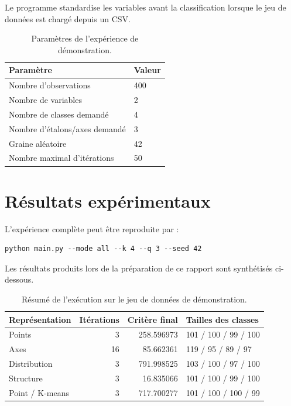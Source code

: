 \documentclass[12pt,a4paper]{article}
\begin{document}
Le programme standardise les variables avant la classification lorsque le jeu de données est chargé depuis un CSV.

\begin{table}[H]
\centering
\caption{Paramètres de l'expérience de démonstration.}
\begin{tabular}{ll}
\toprule
Paramètre & Valeur \\
\midrule
Nombre d'observations & 400 \\
Nombre de variables & 2 \\
Nombre de classes demandé & 4 \\
Nombre d'étalons/axes demandé & 3 \\
Graine aléatoire & 42 \\
Nombre maximal d'itérations & 50 \\
\bottomrule
\end{tabular}
\end{table}

\section{Résultats expérimentaux}

L'expérience complète peut être reproduite par :

\begin{verbatim}
python main.py --mode all --k 4 --q 3 --seed 42
\end{verbatim}

Les résultats produits lors de la préparation de ce rapport sont synthétisés ci-dessous.

\begin{table}[H]
\centering
\caption{Résumé de l'exécution sur le jeu de données de démonstration.}
\begin{tabular}{lrrl}
\toprule
Représentation & Itérations & Critère final & Tailles des classes \\
\midrule
Points & 3 & 258.596973 & 101 / 100 / 99 / 100 \\
Axes & 16 & 85.662361 & 119 / 95 / 89 / 97 \\
Distribution & 3 & 791.998525 & 103 / 100 / 97 / 100 \\
Structure & 3 & 16.835066 & 101 / 100 / 99 / 100 \\
Point / K-means & 3 & 717.700277 & 101 / 100 / 100 / 99 \\
\bottomrule
\end{tabular}
\end{table}
\end{document}
